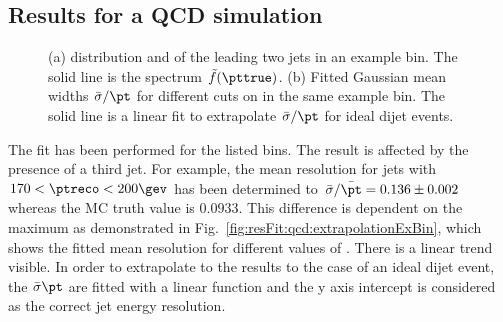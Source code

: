 \documentclass[a4paper]{cmspaper} %
\begin{document}
\subsection{Results for a QCD simulation}
\begin{figure}[ht]
  \begin{center}
     
  \end{center}
  \caption{(a) \ptpart distribution and of the leading two jets in an example \pt bin.
    The solid line is the spectrum $\tilde{f}(\pttrue)$.
    (b) Fitted Gaussian mean widths $\bar{\sigma}/\pt$ for different cuts on \ptrel in the same example \pt bin.
    The solid line is a linear fit to extrapolate $\bar{\sigma}/\pt$ for ideal dijet events.}
\end{figure}

The fit has been performed for the listed \pt bins.
The result is affected by the presence of a third jet.
For example, the mean resolution for jets with \mbox{$170 < \ptreco < 200\gev$} has been determined to \mbox{$\bar{\sigma}/\bar{\pt} = 0.136 \pm 0.002$} whereas the MC truth value is \mbox{$0.0933$}.
This difference is dependent on the maximum \ptrel as demonstrated in Fig.~\ref{fig:resFit:qcd:extrapolationExBin}, which shows the fitted mean resolution for different values of \ptrel.
There is a linear trend visible.
In order to extrapolate to the results to the case of an ideal dijet event, the $\bar{\sigma}\/\pt$ are fitted with a linear function and the y axis intercept is considered as the correct jet energy resolution.
\end{document}
